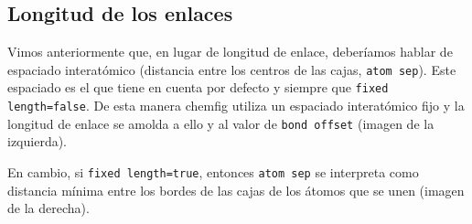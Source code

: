 \subsection{Longitud de los enlaces}
Vimos anteriormente que, en lugar de longitud de enlace, deberíamos hablar de espaciado
interatómico (distancia entre los centros de las cajas, \texttt{atom sep}).
Este espaciado es el que tiene en cuenta por defecto y siempre que
\texttt{fixed length=false}. De esta manera \textsf{chemfig} utiliza un espaciado
interatómico fijo y la longitud de enlace se amolda a ello y al valor de
\texttt{bond offset} (imagen de la izquierda).

En cambio, si \texttt{fixed length=true}, entonces \texttt{atom sep} se interpreta como
distancia mínima entre los bordes de las cajas de los átomos que se unen (imagen de la
derecha).

